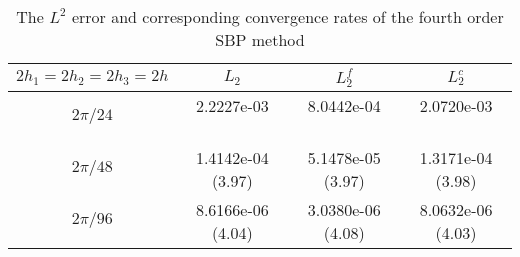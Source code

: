 \begin{table}[htb]
	\begin{center}
		\begin{tabular}{|c|c c c|}
			\hline
			$2h_1 = 2h_2 = 2h_3 = 2h$   & $L_2$ & $L_2^f$ & $L_2^c$  \\
			\hline
			$2\pi/24$ &2.2227e-03 ~~~~~~~~ & 8.0442e-04 ~~~~~~~~ & 2.0720e-03 ~~~~~~~~\\
			\hline
			$2\pi/48$ &1.4142e-04 (3.97) & 5.1478e-05 (3.97) & 1.3171e-04 (3.98)\\
			\hline 
			$2\pi/96$ &8.6166e-06 (4.04) & 3.0380e-06 (4.08) & 8.0632e-06 (4.03)\\
			\hline
		\end{tabular}
	\end{center}
	\caption{The $L^2$ error and corresponding convergence rates of the fourth order SBP method }\label{convergence_rate}
\end{table} 
